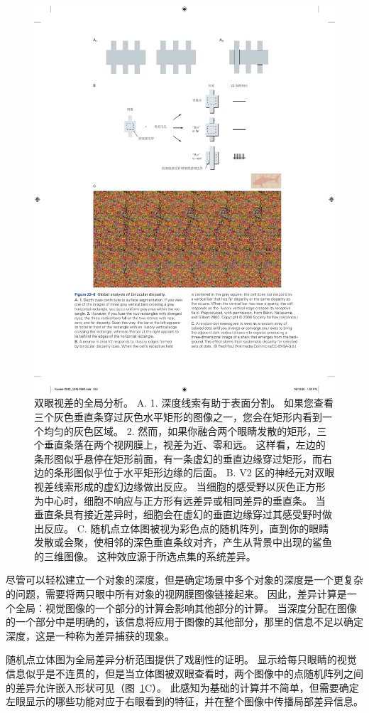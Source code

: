 \begin{figure}[htbp]
	\centering
	\includegraphics[width=0.75\linewidth]{chap23/fig_23_8}
	\caption{双眼视差的全局分析。
		A. 1. 深度线索有助于表面分割。
		如果您查看三个灰色垂直条穿过灰色水平矩形的图像之一，您会在矩形内看到一个均匀的灰色区域。
		2. 然而，如果你融合两个眼睛发散的矩形，三个垂直条落在两个视网膜上，视差为近、零和远。
		这样看，左边的条形图似乎悬停在矩形前面，有一条虚幻的垂直边缘穿过矩形，而右边的条形图似乎位于水平矩形边缘的后面。
		B. V2 区的神经元对双眼视差线索形成的虚幻边缘做出反应。
		当细胞的感受野以灰色正方形为中心时，细胞不响应与正方形有远差异或相同差异的垂直条。
		当垂直条具有接近差异时，细胞会在虚幻的垂直边缘穿过其感受野时做出反应\cite{bakin2000visual}。
		C. 随机点立体图被视为彩色点的随机阵列，直到你的眼睛发散或会聚，使相邻的深色垂直条纹对齐，产生从背景中出现的鲨鱼的三维图像。
		这种效应源于所选点集的系统差异。}
	\label{fig:23_8}
\end{figure}


尽管可以轻松建立一个对象的深度，但是确定场景中多个对象的深度是一个更复杂的问题，需要将两只眼中所有对象的视网膜图像链接起来。
因此，差异计算是一个全局：视觉图像的一个部分的计算会影响其他部分的计算。
当深度分配在图像的一个部分中是明确的，该信息将应用于图像的其他部分，那里的信息不足以确定深度，这是一种称为差异捕获的现象。


随机点立体图为全局差异分析范围提供了戏剧性的证明。
显示给每只眼睛的视觉信息似乎是不连贯的，但是当立体图被双眼查看时，两个图像中的点随机阵列之间的差异允许嵌入形状可见（图~\ref{fig:23_8}C）。
此感知为基础的计算并不简单，但需要确定左眼显示的哪些功能对应于右眼看到的特征，并在整个图像中传播局部差异信息。


